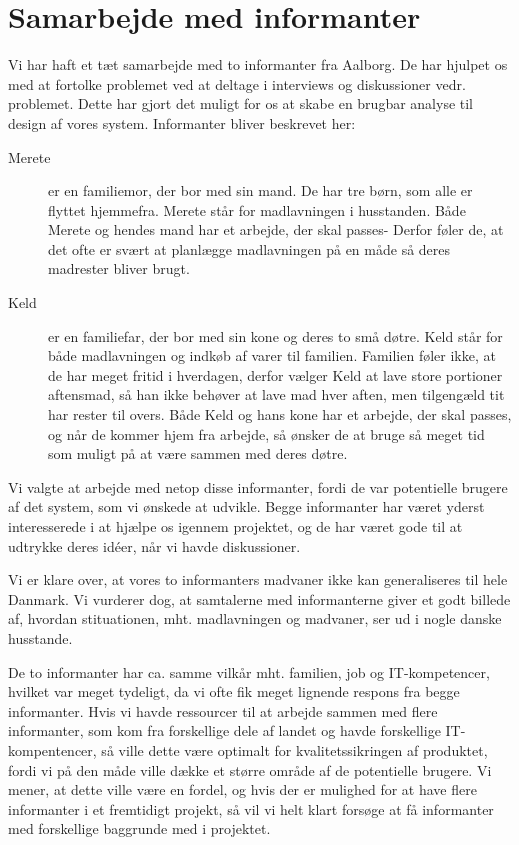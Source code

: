 \chapter{Samarbejde med informanter}
\label{akademiskinformanter}

Vi har haft et tæt samarbejde med to informanter fra Aalborg. De har hjulpet os med at fortolke problemet ved at deltage i interviews og diskussioner vedr. problemet. Dette har gjort det muligt for os at skabe en brugbar analyse til design af vores system. Informanter bliver beskrevet her:

\begin{description}
\item[Merete] er en familiemor, der bor med sin mand. De har tre børn, som alle er flyttet hjemmefra. Merete står for madlavningen i husstanden. Både Merete og hendes mand har et arbejde, der skal passes- Derfor føler de, at det ofte er svært at planlægge madlavningen på en måde så deres madrester bliver brugt.

\item[Keld] er en familiefar, der bor med sin kone og deres to små døtre. Keld står for både madlavningen og indkøb af varer til familien. Familien føler ikke, at de har meget fritid i hverdagen, derfor vælger Keld at lave store portioner aftensmad, så han ikke behøver at lave mad hver aften, men tilgengæld tit har rester til overs. Både Keld og hans kone har et arbejde, der skal passes, og når de kommer hjem fra arbejde, så ønsker de at bruge så meget tid som muligt på at være sammen med deres døtre.
\end{description}

Vi valgte at arbejde med netop disse informanter, fordi de var potentielle brugere af det system, som vi ønskede at udvikle. Begge informanter har været yderst interesserede i at hjælpe os igennem projektet, og de har været gode til at udtrykke deres idéer, når vi havde diskussioner.

Vi er klare over, at vores to informanters madvaner ikke kan generaliseres til hele Danmark. Vi vurderer dog, at samtalerne med informanterne giver et godt billede af, hvordan stituationen, mht. madlavningen og madvaner, ser ud i nogle danske husstande. 

De to informanter har ca. samme vilkår mht. familien, job og IT-kompetencer, hvilket var meget tydeligt, da vi ofte fik meget lignende respons fra begge informanter. Hvis vi havde ressourcer til at arbejde sammen med flere informanter, som \fx kom fra forskellige dele af landet og havde forskellige IT-kompentencer, så ville dette være optimalt for kvalitetssikringen af produktet, fordi vi på den måde ville dække et større område af de potentielle brugere. Vi mener, at dette ville være en fordel, og hvis der er mulighed for at have flere informanter i et fremtidigt projekt, så vil vi helt klart forsøge at få informanter med forskellige baggrunde med i projektet.

